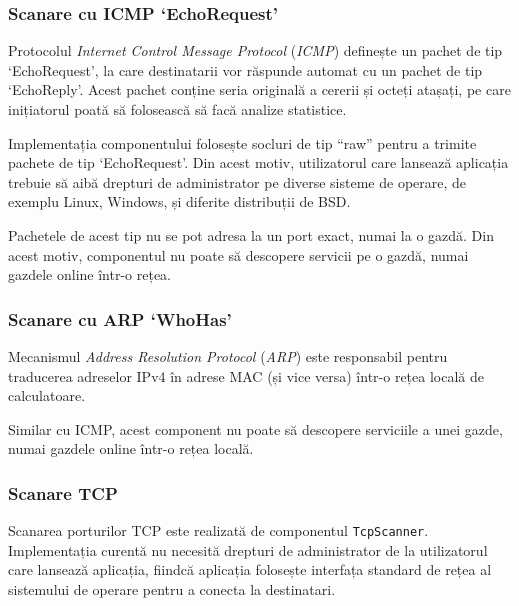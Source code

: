 \subsubsection*{Scanare cu ICMP `EchoRequest'}

	Protocolul \textit{Internet Control Message Protocol} (\textit{ICMP}) definește un pachet de tip `EchoRequest', la care destinatarii vor răspunde automat cu un pachet de tip `EchoReply'. Acest pachet conține seria originală a cererii și octeți atașați, pe care inițiatorul poată să folosească să facă analize statistice.
	
	Implementația componentului folosește socluri de tip ``raw'' pentru a trimite pachete de tip `EchoRequest'. Din acest motiv, utilizatorul care lansează aplicația trebuie să aibă drepturi de administrator pe diverse sisteme de operare, de exemplu Linux, Windows, și diferite distribuții de BSD.
	
	Pachetele de acest tip nu se pot adresa la un port exact, numai la o gazdă. Din acest motiv, componentul nu poate să descopere servicii pe o gazdă, numai gazdele online într-o rețea.

\subsubsection*{Scanare cu ARP `WhoHas'}

	Mecanismul \textit{Address Resolution Protocol} (\textit{ARP}) este responsabil pentru traducerea adreselor IPv4 în adrese MAC (și vice versa) într-o rețea locală de calculatoare.
	
	Similar cu ICMP, acest component nu poate să descopere serviciile a unei gazde, numai gazdele online într-o rețea locală.

\subsubsection*{Scanare TCP}

	Scanarea porturilor TCP este realizată de componentul \texttt{TcpScanner}. Implementația curentă nu necesită drepturi de administrator de la utilizatorul care lansează aplicația, fiindcă aplicația folosește interfața standard de rețea al sistemului de operare pentru a conecta la destinatari.
	
